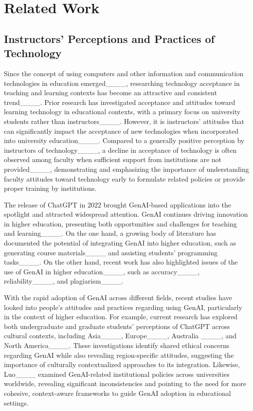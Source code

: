 \section{Related Work}
\subsection{Instructors' Perceptions and Practices of Technology}
Since the concept of using computers and other information and communication technologies in education emerged____, researching technology acceptance in teaching and learning contexts has become an attractive and consistent trend____. Prior research has investigated acceptance and attitudes toward learning technology in educational contexts, with a primary focus on university students rather than instructors____. However, it is instructors' attitudes that can significantly impact the acceptance of new technologies when incorporated into university education____. 
Compared to a generally positive perception by instructors of technology____, a decline in acceptance of technology is often observed among faculty when sufficient support from institutions are not provided____, demonstrating and emphasizing the importance of understanding faculty attitudes toward technology early to formulate related policies or provide proper training by institutions.

The release of ChatGPT in 2022 brought GenAI-based applications into the spotlight and attracted widespread attention. GenAI continues driving innovation in higher education, presenting both opportunities and challenges for teaching and learning____. On the one hand, a growing body of literature has documented the potential of integrating GenAI into higher education, such as generating course materials____ and assisting students' programming tasks____. On the other hand, recent work has also highlighted issues of the use of GenAI in higher education____, such as accuracy____, reliability____, and plagiarism____. 

With the rapid adoption of GenAI across different fields, recent studies have looked into people's attitudes and practices regarding using GenAI, particularly in the context of higher education.  For example, current research has explored both undergraduate and graduate students' perceptions of ChatGPT across cultural contexts, including Asia____, Europe____, Australia ____, and North America____. These investigations identify shared ethical concerns regarding GenAI while also revealing region-specific attitudes, suggesting the importance of culturally contextualized approaches to its integration. Likewise, Luo____ examined GenAI-related institutional policies across universities worldwide, revealing significant inconsistencies and pointing to the need for more cohesive, context-aware frameworks to guide GenAI adoption in educational settings. 

